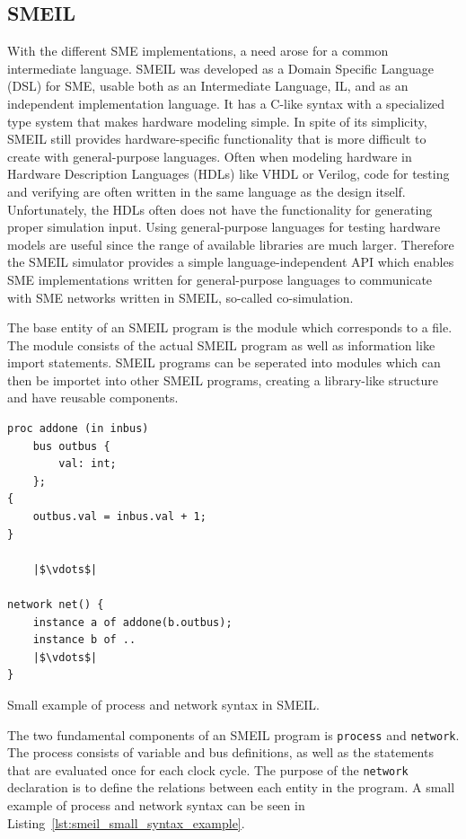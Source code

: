 \subsection{SMEIL}
\label{SMEIL-section}
With the different SME implementations, a need arose for a common intermediate language. SMEIL was developed as a Domain Specific Language (DSL) for SME, usable both as an Intermediate Language, IL, and as an independent implementation language. It has a C-like syntax with a specialized type system that makes hardware modeling simple. In spite of its simplicity, SMEIL still provides hardware-specific functionality that is more difficult to create with general-purpose languages.
Often when modeling hardware in Hardware Description Languages (HDLs) like VHDL or Verilog, code for testing and verifying are often written in the same language as the design itself. Unfortunately, the HDLs often does not have the functionality for generating proper simulation input. Using general-purpose languages for testing hardware models are useful since the range of available libraries are much larger.
Therefore the SMEIL simulator provides a simple language-independent API which enables SME implementations written for general-purpose languages to communicate with SME networks written in SMEIL, so-called co-simulation.


The base entity of an SMEIL program is the module which corresponds to a file. The module consists of the actual SMEIL program as well as information like import statements. SMEIL programs can be seperated into modules which can then be importet into other SMEIL programs, creating a library-like structure and have reusable components. \\
\begin{listing}
\begin{verbatim}
proc addone (in inbus)
    bus outbus {
        val: int;
    };
{
    outbus.val = inbus.val + 1;
}

    |$\vdots$|

network net() {
    instance a of addone(b.outbus);
    instance b of ..
    |$\vdots$|
}
\end{verbatim}
\caption{Small example of process and network syntax in SMEIL.}
\label{lst:smeil_small_syntax_example}
\end{listing}

The two fundamental components of an SMEIL program is \texttt{process} and \texttt{network}. The process consists of variable and bus definitions, as well as the statements that are evaluated once for each clock cycle. The purpose of the \texttt{network} declaration is to define the relations between each entity in the program. A small example of process and network syntax can be seen in Listing~\ref{lst:smeil_small_syntax_example}.

